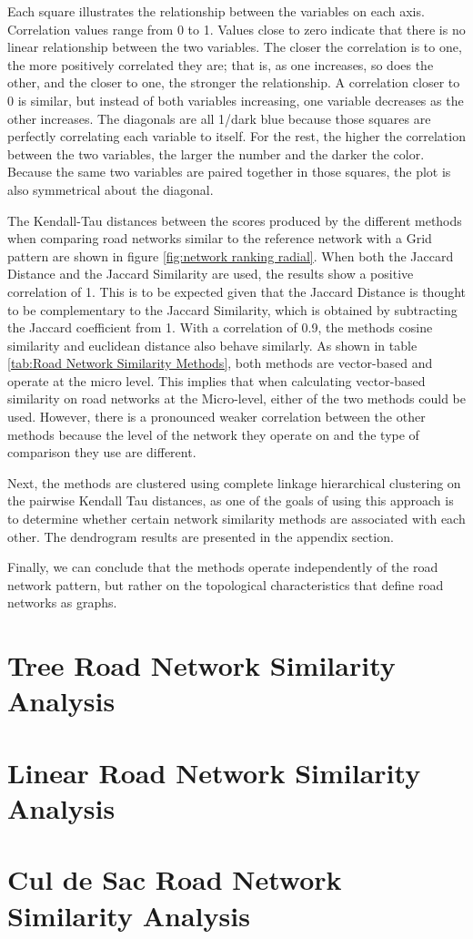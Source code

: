 Each square illustrates the relationship between the variables on each axis. Correlation values range from 0 to 1. Values close to zero indicate that there is no linear relationship between the two variables. The closer the correlation is to one, the more positively correlated they are; that is, as one increases, so does the other, and the closer to one, the stronger the relationship. A correlation closer to 0 is similar, but instead of both variables increasing, one variable decreases as the other increases. The diagonals are all 1/dark blue because those squares are perfectly correlating each variable to itself. For the rest, the higher the correlation between the two variables, the larger the number and the darker the color. Because the same two variables are paired together in those squares, the plot is also symmetrical about the diagonal.

The Kendall-Tau distances between the scores produced by the different methods when comparing road networks similar to the reference network with a Grid pattern are shown in figure \ref{fig:network ranking radial}. When both the Jaccard Distance and the Jaccard Similarity are used, the results show a positive correlation of 1. This is to be expected given that the Jaccard Distance is thought to be complementary to the Jaccard Similarity, which is obtained by subtracting the Jaccard coefficient from 1. With a correlation of 0.9, the methods cosine similarity and euclidean distance also behave similarly. As shown in table \ref{tab:Road Network Similarity Methods}, both methods are vector-based and operate at the micro level. This implies that when calculating vector-based similarity on road networks at the Micro-level, either of the two methods could be used. However, there is a pronounced weaker correlation between the other methods because the level of the network they operate on and the type of comparison they use are different.

Next, the methods are clustered using complete linkage hierarchical clustering on the pairwise Kendall Tau distances, as one of the goals of using this approach is to determine whether certain network similarity methods are associated with each other. The dendrogram results are presented in the appendix section.

Finally, we can conclude that the methods operate independently of the road network pattern, but rather on the topological characteristics that define road networks as graphs.


\section{Tree Road Network Similarity Analysis}
\section{Linear Road Network Similarity Analysis}
\section{Cul de Sac Road Network Similarity Analysis}
